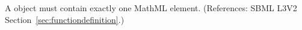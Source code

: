 A \FunctionDefinition object must contain exactly one MathML 
element.  (References: SBML L3V2 Section~\ref{sec:functiondefinition}.)
